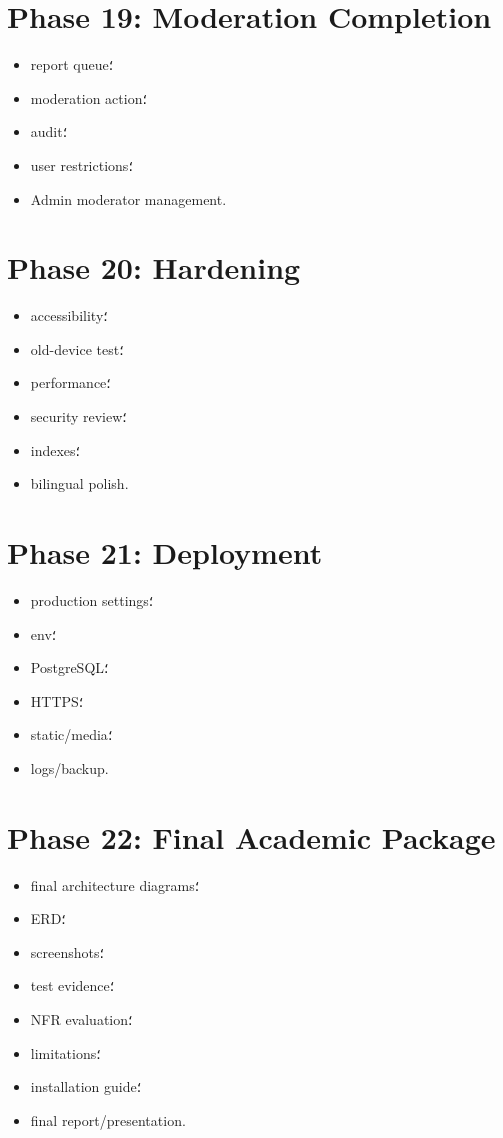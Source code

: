 \section{Phase 19: Moderation Completion}

\begin{itemize}
  \item report queue؛
  \item moderation action؛
  \item audit؛
  \item user restrictions؛
  \item Admin moderator management.
\end{itemize}

\section{Phase 20: Hardening}

\begin{itemize}
  \item accessibility؛
  \item old-device test؛
  \item performance؛
  \item security review؛
  \item indexes؛
  \item bilingual polish.
\end{itemize}

\section{Phase 21: Deployment}

\begin{itemize}
  \item production settings؛
  \item env؛
  \item PostgreSQL؛
  \item HTTPS؛
  \item static/media؛
  \item logs/backup.
\end{itemize}

\section{Phase 22: Final Academic Package}

\begin{itemize}
  \item final architecture diagrams؛
  \item ERD؛
  \item screenshots؛
  \item test evidence؛
  \item NFR evaluation؛
  \item limitations؛
  \item installation guide؛
  \item final report/presentation.
\end{itemize}

